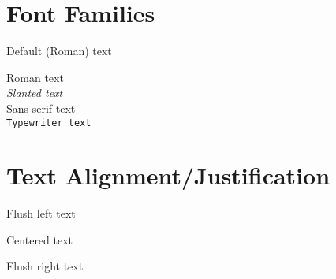 \documentclass{article}
\begin{document}
    \section{Font Families}
    \textrm{Default (Roman) text} \\ \raggedright
    \textrm{Roman text} \\
    \textsl{Slanted text} \\
    \textsf{Sans serif text} \\
    \texttt{Typewriter text} %
    \\[2\baselineskip]


    \section{Text Alignment/Justification}
    \begin{flushleft} Flush left text \end{flushleft}
    \begin{center} Centered text \end{center}
    \begin{flushright} Flush right text \end{flushright}
\end{document}
